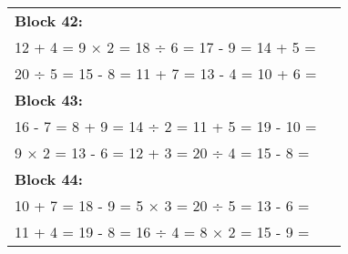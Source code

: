 \documentclass[a4paper,12pt]{scrartcl}
\begin{document}
\begin{adjustbox}{center, valign=c}
\begin{tabular}{@{}p{0.95\linewidth}@{}}
\textbf{Block 42:}\\
12 + 4 = \hfill 9 × 2 = \hfill 18 ÷ 6 = \hfill 17 - 9 = \hfill 14 + 5 =\\
20 ÷ 5 = \hfill 15 - 8 = \hfill 11 + 7 = \hfill 13 - 4 = \hfill 10 + 6 =\\[0.6em]

\textbf{Block 43:}\\
16 - 7 = \hfill 8 + 9 = \hfill 14 ÷ 2 = \hfill 11 + 5 = \hfill 19 - 10 =\\
9 × 2 = \hfill 13 - 6 = \hfill 12 + 3 = \hfill 20 ÷ 4 = \hfill 15 - 8 =\\[0.6em]

\textbf{Block 44:}\\
10 + 7 = \hfill 18 - 9 = \hfill 5 × 3 = \hfill 20 ÷ 5 = \hfill 13 - 6 =\\
11 + 4 = \hfill 19 - 8 = \hfill 16 ÷ 4 = \hfill 8 × 2 = \hfill 15 - 9 =\\[0.6em]

\end{tabular}
\end{adjustbox}
\end{document}
